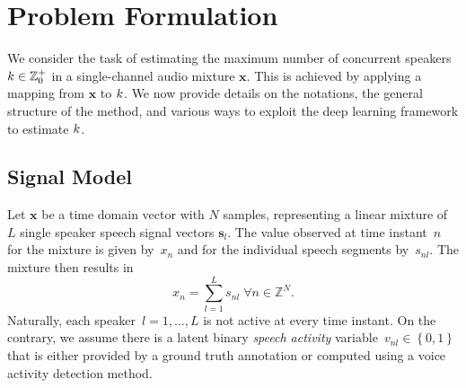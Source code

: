 \section{Problem Formulation}%
\label{sec:problem_formulation}
We consider the task of estimating the maximum number of concurrent speakers \( k \in \mathbb{Z}^{+}_{0} \) in a single-channel audio mixture \(\mathbf{x}\).
This is achieved by applying a mapping from \(\mathbf{x}\) to \(k \).
We now provide details on the notations, the general structure of the method, and various ways to exploit the deep learning framework to estimate \(k \).

\subsection{Signal Model}%
\label{ssec:signal_model}
Let \(\mathbf{x}\) be a time domain vector with \(N\) samples, representing a linear mixture of \(L\) single speaker speech signal vectors \(\mathbf{s}_l\).
The value observed at time instant~\(n\) for the mixture is given by~$x_n$ and for the individual speech segments by~$s_{nl}$.
The mixture then results in
%
\begin{equation}
  x_n = \sum_{l=1}^{L}{s_{nl}} \; \forall n \in \mathbb{Z}^N.
  \label{eq:mixing_model}
\end{equation}
%
Naturally, each speaker~$l=1,\dots,L$ is not active at every time instant.
On the contrary, we assume there is a latent binary \textit{speech activity} variable~$v_{nl}\in \left\{ 0,1 \right\}$ that is either provided by a ground truth annotation or computed using a voice activity detection method.

